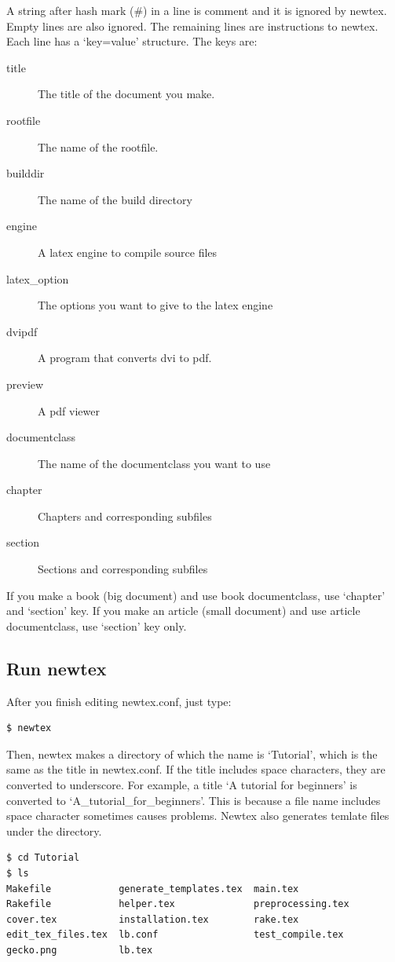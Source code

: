 A string after hash mark (\#) in a line is comment and it is ignored by newtex.
Empty lines are also ignored.
The remaining lines are instructions to newtex.
Each line has a `key=value' structure.
The keys are:
\begin{description}
\item[title] The title of the document you make.
\item[rootfile] The name of the rootfile.
\item[builddir] The name of the build directory
\item[engine] A latex engine to compile source files
\item[latex\_option] The options you want to give to the latex engine
\item[dvipdf] A program that converts dvi to pdf.
\item[preview] A pdf viewer
\item[documentclass] The name of the documentclass you want to use
\item[chapter] Chapters and corresponding subfiles
\item[section] Sections and corresponding subfiles
\end{description}
If you make a book (big document) and use book documentclass, use `chapter' and `section' key.
If you make an article (small document) and use article documentclass, use `section' key only.

\subsection{Run newtex}
After you finish editing newtex.conf, just type:
\begin{verbatim}
$ newtex
\end{verbatim}
Then, newtex makes a directory of which the name is `Tutorial', which is the same as the title in newtex.conf.
If the title includes space characters, they are converted to underscore.
For example, a title `A tutorial for beginners' is converted to `A\_tutorial\_for\_beginners'.
This is because a file name includes space character sometimes causes problems.
Newtex also generates temlate files under the directory.
\begin{verbatim}
$ cd Tutorial
$ ls
Makefile            generate_templates.tex  main.tex
Rakefile            helper.tex              preprocessing.tex
cover.tex           installation.tex        rake.tex
edit_tex_files.tex  lb.conf                 test_compile.tex
gecko.png           lb.tex
\end{verbatim}


